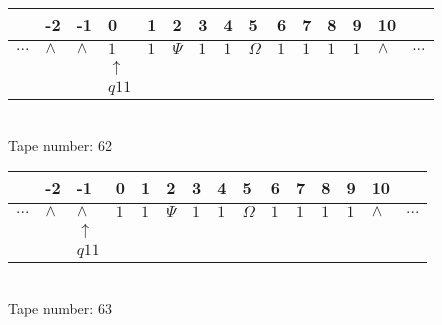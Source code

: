 \documentclass{article}
\begin{document}
\begin{table}[H]
\centering
\begin{tabular}{lllllllllllllll}
 & -2 & -1 & 0 & 1 & 2 & 3 & 4 & 5 & 6 & 7 & 8 & 9 & 10 & \\
\hline
$...$ & \multicolumn{1}{|l|}{$\wedge$} & \multicolumn{1}{|l|}{$\wedge$} & \multicolumn{1}{|l|}{$1$} & \multicolumn{1}{|l|}{$1$} & \multicolumn{1}{|l|}{$\Psi$} & \multicolumn{1}{|l|}{$1$} & \multicolumn{1}{|l|}{$1$} & \multicolumn{1}{|l|}{$\Omega$} & \multicolumn{1}{|l|}{$1$} & \multicolumn{1}{|l|}{$1$} & \multicolumn{1}{|l|}{$1$} & \multicolumn{1}{|l|}{$1$} & \multicolumn{1}{|l|}{$\wedge$} & $...$\\
\hline
&  &  & $\uparrow$ &  &  &  &  &  &  &  &  &  &  &  \\
&  &  & $ q11 $ &  &  &  &  &  &  &  &  &  &  &  \\
\end{tabular}
\\
Tape number: 62
\noindent\makebox[\linewidth]{\hdashrule{\textwidth}{1pt}{1pt}}\end{table}
\clearpage

\begin{table}[H]
\centering
\begin{tabular}{lllllllllllllll}
 & -2 & -1 & 0 & 1 & 2 & 3 & 4 & 5 & 6 & 7 & 8 & 9 & 10 & \\
\hline
$...$ & \multicolumn{1}{|l|}{$\wedge$} & \multicolumn{1}{|l|}{$\wedge$} & \multicolumn{1}{|l|}{$1$} & \multicolumn{1}{|l|}{$1$} & \multicolumn{1}{|l|}{$\Psi$} & \multicolumn{1}{|l|}{$1$} & \multicolumn{1}{|l|}{$1$} & \multicolumn{1}{|l|}{$\Omega$} & \multicolumn{1}{|l|}{$1$} & \multicolumn{1}{|l|}{$1$} & \multicolumn{1}{|l|}{$1$} & \multicolumn{1}{|l|}{$1$} & \multicolumn{1}{|l|}{$\wedge$} & $...$\\
\hline
&  & $\uparrow$ &  &  &  &  &  &  &  &  &  &  &  &  \\
&  & $ q11 $ &  &  &  &  &  &  &  &  &  &  &  &  \\
\end{tabular}
\\
Tape number: 63
\noindent\makebox[\linewidth]{\hdashrule{\textwidth}{1pt}{1pt}}\end{table}
\end{document}
